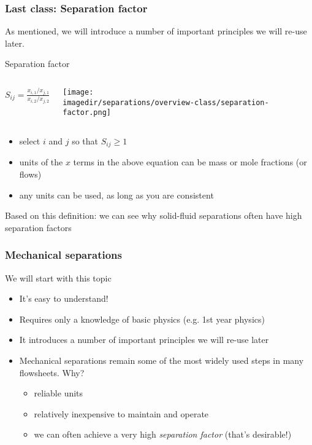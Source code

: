 
\begin{frame}\frametitle{Last class: Separation factor}
	As mentioned, we will introduce a number of important principles we will re-use later.

	\begin{exampleblock}{{\color{purple} Separation factor}}
		\begin{columns}[c]
				$S_{ij} = \displaystyle \frac{x_{i,1} / x_{j,1}}{x_{i,2} / x_{j,2}}$
				\begin{center}
					\texttt{[image: \\imagedir/separations/overview-class/separation-factor.png]}
				\end{center}
		\end{columns}
	\end{exampleblock}

	\begin{itemize}
		\item	select $i$ and $j$ so that $S_{ij} \geq 1$
		\item	units of the $x$ terms in the above equation can be mass or mole fractions (or flows)
		\item	any units can be used, as long as you are consistent
	\end{itemize}

	Based on this definition: we can see why solid-fluid separations often have high separation factors
\end{frame}

\begin{frame}\frametitle{Mechanical separations}
	We will start with this topic
	\begin{itemize}
		\item	It's easy to understand!
		\item	Requires only a knowledge of basic physics (e.g. 1st year physics)
		\item	It introduces a number of important principles we will re-use later
		\item	Mechanical separations remain some of the most widely used steps in many flowsheets. Why?
		\begin{itemize}
			\item	reliable units
			\item	relatively inexpensive to maintain and operate
			\item	we can often achieve a very high \emph{separation factor} (that's desirable!)
		\end{itemize}
	\end{itemize}
\end{frame}

